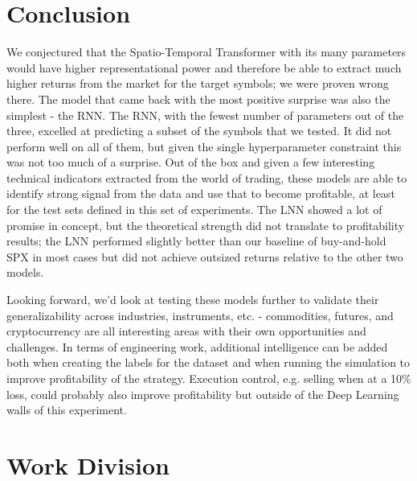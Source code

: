 \documentclass[10pt,twocolumn,letterpaper]{article}
\begin{document}
\section{Conclusion}

We conjectured that the Spatio-Temporal Transformer with its many parameters would have higher representational power and therefore be able to extract much higher returns from the market for the target symbols; we were proven wrong there. The model that came back with the most positive surprise was also the simplest - the RNN. The RNN, with the fewest number of parameters out of the three, excelled at predicting a subset of the symbols that we tested. It did not perform well on all of them, but given the single hyperparameter constraint this was not too much of a surprise. Out of the box and given a few interesting technical indicators extracted from the world of trading, these models are able to identify strong signal from the data and use that to become profitable, at least for the test sets defined in this set of experiments. The LNN showed a lot of promise in concept, but the theoretical strength did not translate to profitability results; the LNN performed slightly better than our baseline of buy-and-hold SPX in most cases but did not achieve outsized returns relative to the other two models.

Looking forward, we’d look at testing these models further to validate their generalizability across industries, instruments, etc. - commodities, futures, and cryptocurrency are all interesting areas with their own opportunities and challenges. In terms of engineering work, additional intelligence can be added both when creating the labels for the dataset and when running the simulation to improve profitability of the strategy. Execution control, e.g. selling when at a 10\% loss, could probably also improve profitability but outside of the Deep Learning walls of this experiment.





\clearpage
\section{Work Division}
\end{document}
